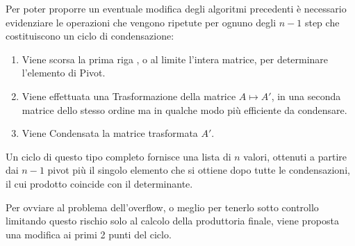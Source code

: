 \documentclass{article}
\begin{document}
Per poter proporre un eventuale modifica degli algoritmi precedenti è necessario evidenziare le operazioni che vengono ripetute per ognuno degli $n-1$ step che costituiscono un ciclo di condensazione:
\begin{enumerate}
\item Viene scorsa la prima riga , o al limite l'intera matrice, per determinare l'elemento di Pivot.
\item Viene effettuata una Trasformazione della matrice $ A \mapsto A'$, in una seconda matrice dello stesso ordine ma in qualche modo più efficiente da condensare.
\item Viene Condensata la matrice trasformata $A'$.
\end{enumerate}
Un ciclo di questo tipo completo fornisce una lista di $n$ valori, ottenuti a partire dai $n-1$ pivot più il singolo elemento che si ottiene dopo tutte le condensazioni, il cui prodotto coincide con il determinante.

Per ovviare al problema dell'overflow, o meglio per tenerlo sotto controllo limitando questo rischio solo al calcolo della produttoria finale, viene proposta una modifica ai primi 2 punti del ciclo.
\end{document}

